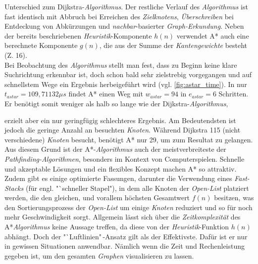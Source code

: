 \documentclass[12pt]{article}
\begin{document}
Unterschied zum Dijkstra-\textit{Algorithmus}. Der restliche Verlauf des \textit{Algorithmus} ist fast identisch mit Abbruch bei Erreichen des \textit{Zielknotens}, \textit{Überschreiben} bei Entdeckung von Abkürzungen und \textit{nachbar}-basierter \textit{Graph-Erkundung}. Neben der bereits beschriebenen \textit{Heuristik}-Komponente $h(n)$ verwendet A* auch eine berechnete Komponente $g(n)$, die aus der Summe der \textit{Kantengewichte} besteht (Z. 16).
\\
Bei Beobachtung des \textit{Algorithmus} stellt man fest, dass zu Beginn keine klare Suchrichtung erkennbar ist, doch schon bald sehr zielstrebig vorgegangen und auf schnellstem Wege ein Ergebnis herbeigeführt wird (vgl. \autoref{fig:astar_time}). In nur $t_{astar} = 109,71132\mu s$ findet A* einen Weg mit $w_{astar} = 94$ in $e_{astar} = 6$ Schritten. Er benötigt somit weniger als halb so lange wie der Dijkstra-\textit{Algorithmus}, 

\noindent erzielt aber ein nur geringfügig schlechteres Ergebnis. Am Bedeutendsten ist jedoch die geringe Anzahl an besuchten \textit{Knoten}. Während Dijkstra 115 (nicht verschiedene) \textit{Knoten} besucht, benötigt A* nur 29, um zum Resultat zu gelangen.
\\
Aus diesem Grund ist der A*-\textit{Algorithmus} auch der meistverbreiteste der \textit{Pathfinding-Algorithmen}, besonders im Kontext von Computerspielen. Schnelle und akzeptable Lösungen und ein flexibles Konzept machen A* so attraktiv. Zudem gibt es einige optimierte Fassungen, darunter die Verwendung eines \textit{Fast-Stacks} (für engl. "`schneller Stapel"), in dem alle Knoten der \textit{Open-List} platziert werden, die den gleichen, und vorallem höchsten Gesamtwert $f(n)$ besitzen, was den Sortierungsprozess der \textit{Open-List} um einige \textit{Knoten} reduziert und so für noch mehr Geschwindigkeit sorgt. Allgemein lässt sich über die \textit{Zeitkomplexität} des A*\textit{Algorithmus} keine Aussage treffen, da diese von der \textit{Heuristik}-Funktion $h(n)$ abhängt. Doch der "`Luftlinien"\,-Ansatz gilt als der Effektivste. Dafür ist er nur in gewissen Situationen anwendbar. Nämlich wenn die Zeit und Rechenleistung gegeben ist, um den gesamten \textit{Graphen} visualisieren zu lassen.
\end{document}
